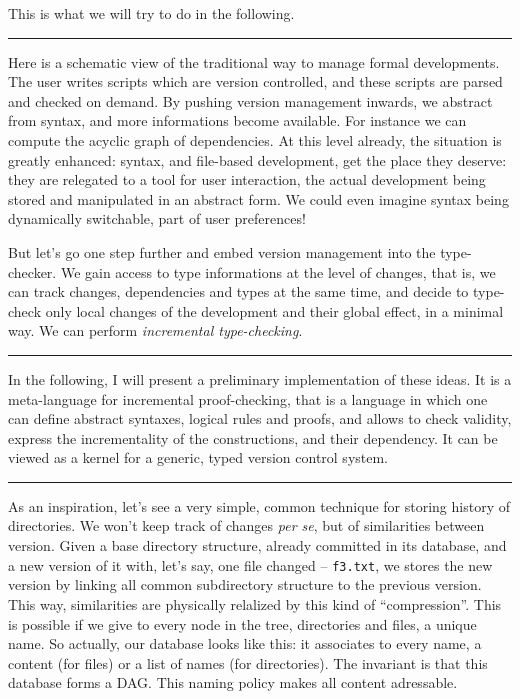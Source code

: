 \documentclass[12pt]{article}
\newcommand{\slide}{\vspace{1em} \hrule \vspace{1em}}
\begin{document}
This is what we will try to do in the following.

\slide

Here is a schematic view of the traditional way to manage formal
developments. The user writes scripts which are version controlled,
and these scripts are parsed and checked on demand. By pushing version
management inwards, we abstract from syntax, and more informations
become available. For instance we can compute the acyclic graph of
dependencies. At this level already, the situation is greatly
enhanced: syntax, and file-based development, get the place they
deserve: they are relegated to a tool for user interaction, the actual
development being stored and manipulated in an abstract form. We could
even imagine syntax being dynamically switchable, part of user
preferences!

But let's go one step further and embed version management into the
type-checker. We gain access to type informations at the level of
changes, that is, we can track changes, dependencies and types at the
same time, and decide to type-check only local changes of the
development and their global effect, in a minimal way. We can perform
\emph{incremental type-checking}.

\slide

In the following, I will present a preliminary implementation of these
ideas. It is a meta-language for incremental proof-checking, that is a
language in which one can define abstract syntaxes, logical rules and
proofs, and allows to check validity, express the incrementality of
the constructions, and their dependency. It can be viewed as a kernel
for a generic, typed version control system.

\slide

As an inspiration, let's see a very simple, common technique for
storing history of directories. We won't keep track of changes
\emph{per se}, but of similarities between version. Given a base
directory structure, already committed in its database, and a new
version of it with, let's say, one file changed -- \texttt{f3.txt}, we
stores the new version by linking all common subdirectory structure to
the previous version. This way, similarities are physically relalized
by this kind of ``compression''. This is possible if we give to every
node in the tree, directories and files, a unique name. So actually,
our database looks like this: it associates to every name, a content
(for files) or a list of names (for directories). The invariant is
that this database forms a DAG. This naming policy makes all content
adressable.
\end{document}
